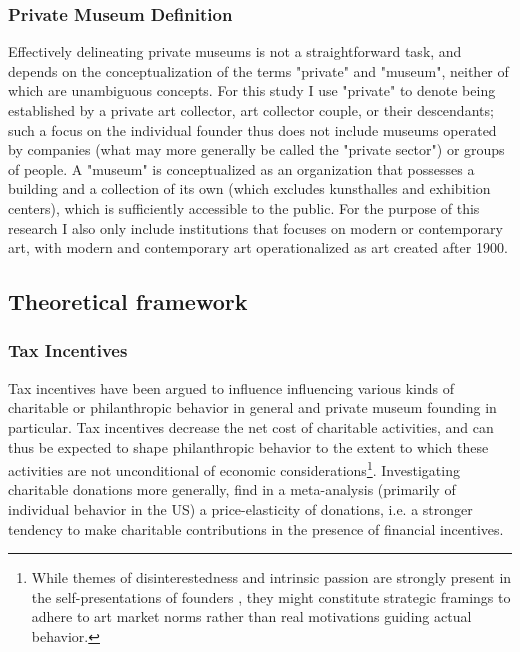 \documentclass[11pt]{article}
\begin{document}
\subsubsection*{Private Museum Definition}

Effectively delineating private museums is not a straightforward task, and depends on the conceptualization of the terms "private" and "museum", neither of which are unambiguous concepts.
For this study I use "private" to denote being established by a private art collector, art collector couple, or their descendants; such a focus on the individual founder thus does not include museums operated by companies (what may more generally be called the "private sector") or groups of people.
A "museum" is conceptualized as an organization that possesses a building and a collection of its own (which excludes kunsthalles and exhibition centers), which is sufficiently accessible to the public.
For the purpose of this research I also only include institutions that focuses on modern or contemporary art, with modern and contemporary art operationalized as art created after 1900. 


\subsection*{Theoretical framework}




\subsubsection*{Tax Incentives}





Tax incentives have been argued to influence influencing various kinds of charitable or philanthropic behavior in general and private museum founding in particular.
Tax incentives decrease the net cost of charitable activities, and can thus be expected to shape philanthropic behavior to the extent to which these activities are not unconditional of economic considerations\footnote{While themes of disinterestedness and intrinsic passion are strongly present in the self-presentations of founders \parencite{Bechtler_Imhof_2018_future,Duron_2020_rebaudengo}, they might constitute strategic framings to adhere to art market norms \parencite{Velthuis_2007_talking} rather than real motivations guiding actual behavior.}. 
Investigating charitable donations more generally, \textcite{Peloza_Steel_2005_elasticities} find in a meta-analysis (primarily of individual behavior in the US) a price-elasticity of donations, i.e. a stronger tendency to make charitable contributions in the presence of financial incentives.
\end{document}
